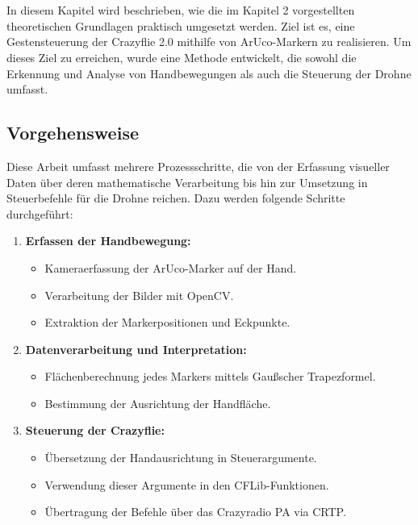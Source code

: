 \chapter{\chapThree}
\label{cha:chapter3} %

\begingroup
\fontsize{12pt}{14pt}\selectfont

In diesem Kapitel wird beschrieben, wie die im Kapitel 2 vorgestellten theoretischen Grundlagen praktisch umgesetzt werden.
Ziel ist es, eine Gestensteuerung der Crazyflie 2.0 mithilfe von ArUco-Markern zu realisieren.
Um dieses Ziel zu erreichen, wurde eine Methode entwickelt, die sowohl die Erkennung und Analyse von Handbewegungen als auch die Steuerung der Drohne umfasst.

\section{Vorgehensweise}

Diese Arbeit umfasst mehrere Prozessschritte, die von der Erfassung visueller Daten über deren mathematische Verarbeitung bis hin zur Umsetzung in Steuerbefehle für die Drohne reichen.
Dazu werden folgende Schritte durchgeführt:

\begin{enumerate}
    \item \textbf{Erfassen der Handbewegung:}
    \begin{itemize}
        \item Kameraerfassung der ArUco-Marker auf der Hand.
        \item Verarbeitung der Bilder mit OpenCV.
        \item Extraktion der Markerpositionen und Eckpunkte.
    \end{itemize}
    \item \textbf{Datenverarbeitung und Interpretation:}
    \begin{itemize}
        \item Flächenberechnung jedes Markers mittels Gaußscher Trapezformel.
        \item Bestimmung der Ausrichtung der Handfläche.
    \end{itemize}
    \item \textbf{Steuerung der Crazyflie:}
    \begin{itemize}
        \item Übersetzung der Handausrichtung in Steuerargumente.
        \item Verwendung dieser Argumente in den CFLib-Funktionen.
        \item Übertragung der Befehle über das Crazyradio PA via CRTP.
    \end{itemize}
\end{enumerate}

